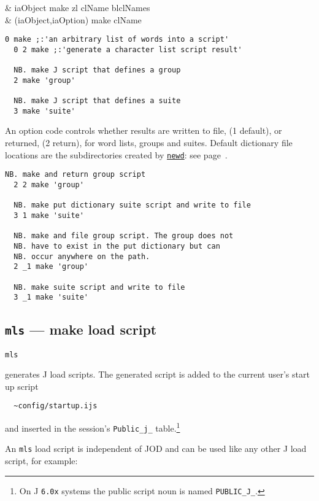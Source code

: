 \begin{wordhead}
\dyad & iaObject make zl \argsep clName \argsep blclNames \\
      & (iaObject,iaOption) make clName \\
\end{wordhead}
\begin{lstlisting}[frame=single,framerule=0pt] 
  0 make ;:'an arbitrary list of words into a script'
  0 2 make ;:'generate a character list script result' 

  NB. make J script that defines a group
  2 make 'group' 
  
  NB. make J script that defines a suite 
  3 make 'suite' 
\end{lstlisting}

An option code controls whether 
results are written to file, (1 default),
or returned, (2 return), for word lists, groups and suites.
Default dictionary file locations are the 
subdirectories created by \hyperlink{il:newd}{\texttt{newd}}: see page~\pageref{ss:newd}.

\begin{lstlisting}[frame=single,framerule=0pt] 
  NB. make and return group script
  2 2 make 'group'  
  
  NB. make put dictionary suite script and write to file 
  3 1 make 'suite'  

  NB. make and file group script. The group does not
  NB. have to exist in the put dictionary but can
  NB. occur anywhere on the path. 
  2 _1 make 'group'

  NB. make suite script and write to file 
  3 _1 make 'suite' 
\end{lstlisting}


\subsection{\texttt{mls} --- make load script}\label{ss:mls} 

\hypertarget{il:mls}{\texttt{mls}} generates J 
load scripts.  
The generated script is added 
to the current user's start up script
\begin{verbatim}
  ~config/startup.ijs
\end{verbatim}
and inserted in the session's \verb|Public_j_| table.\footnote{
On J \texttt{6.0x} systems the public script noun is named \texttt{PUBLIC\_J\_}.}

An \verb|mls| load script is independent of JOD and can be used 
like any other J load script, for example:

